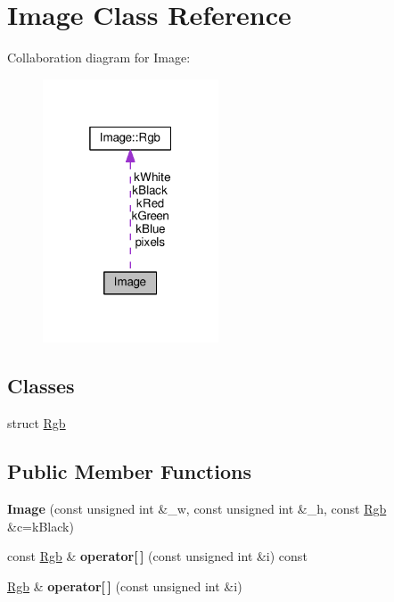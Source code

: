 \hypertarget{classImage}{}\section{Image Class Reference}
\label{classImage}


Collaboration diagram for Image\+:
\nopagebreak
\begin{figure}[H]
\begin{center}
\leavevmode
\includegraphics[width=148pt]{classImage__coll__graph}
\end{center}
\end{figure}
\subsection*{Classes}
\begin{DoxyCompactItemize}
\item 
struct \hyperlink{structImage_1_1Rgb}{Rgb}
\end{DoxyCompactItemize}
\subsection*{Public Member Functions}
\begin{DoxyCompactItemize}
\item 
{\bfseries Image} (const unsigned int \&\+\_\+w, const unsigned int \&\+\_\+h, const \hyperlink{structImage_1_1Rgb}{Rgb} \&c=k\+Black)\hypertarget{classImage_a0ad0eb194da218c3402a187c1d339adb}{}\label{classImage_a0ad0eb194da218c3402a187c1d339adb}

\item 
const \hyperlink{structImage_1_1Rgb}{Rgb} \& {\bfseries operator\mbox{[}$\,$\mbox{]}} (const unsigned int \&i) const \hypertarget{classImage_a86c78da799bb20ff07924de0070f7909}{}\label{classImage_a86c78da799bb20ff07924de0070f7909}

\item 
\hyperlink{structImage_1_1Rgb}{Rgb} \& {\bfseries operator\mbox{[}$\,$\mbox{]}} (const unsigned int \&i)\hypertarget{classImage_a81577616707e17b4b1fdee5eb49151c8}{}\label{classImage_a81577616707e17b4b1fdee5eb49151c8}

\end{DoxyCompactItemize}
